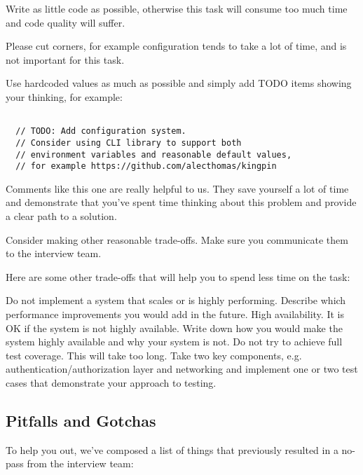 \documentclass{article}
\begin{document}
Write as little code as possible, otherwise this task will consume too much time and code quality will suffer.

Please cut corners, for example configuration tends to take a lot of time, and is not important for this task.

Use hardcoded values as much as possible and simply add TODO items showing your thinking, for example:

\begin{lstlisting}[caption=TODO example]
  
  // TODO: Add configuration system.
  // Consider using CLI library to support both
  // environment variables and reasonable default values,
  // for example https://github.com/alecthomas/kingpin

\end{lstlisting}

Comments like this one are really helpful to us.
They save yourself a lot of time and demonstrate that you've spent time thinking about this problem and provide a clear path to a solution.

Consider making other reasonable trade-offs. Make sure you communicate them to the interview team.

Here are some other trade-offs that will help you to spend less time on the task:


Do not implement a system that scales or is highly performing. Describe which performance improvements you would add in the future.
High availability. It is OK if the system is not highly available. Write down how you would make the system highly available and why your system is not.
Do not try to achieve full test coverage. This will take too long. Take two key components, e.g. authentication/authorization layer and networking and implement one or two test cases that demonstrate your approach to testing.


\subsection{Pitfalls and Gotchas}
    
  To help you out, we've composed a list of things that previously resulted in a no-pass from the interview team:
\end{document}
